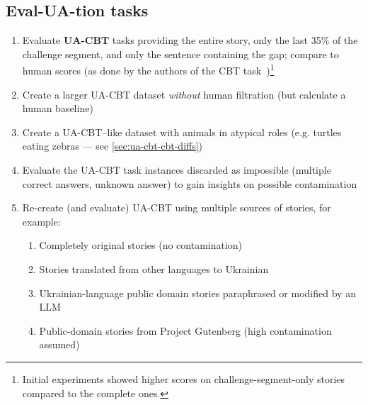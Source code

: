 \subsection{Eval-UA-tion tasks}
\begin{enumerate}
    \tightlist
    \item Evaluate \textbf{UA-CBT} tasks providing the entire story, only the last 35\% of the challenge segment, and only the sentence containing the gap; compare to human scores (as done by the authors of the CBT task~\cite{taskCBT})\footnote{Initial experiments showed higher scores on challenge-segment-only stories compared to the complete ones.}
    \item Create a larger UA-CBT dataset \textit{without} human filtration (but calculate a human baseline)
    \item Create a UA-CBT–like dataset with animals in atypical roles (e.g. turtles eating zebras — see \autoref{sec:ua-cbt-cbt-diffs})

    \item Evaluate the UA-CBT task instances discarded as impossible (multiple correct answers, unknown answer) to gain insights on possible contamination
    \item  Re-create (and evaluate) UA-CBT using multiple sources of stories, for example:
        \begin{enumerate}
            \tightlist
            \item Completely original stories (no contamination)
            \item Stories translated from other languages to Ukrainian
            \item Ukrainian-language public domain stories paraphrased or modified by an LLM
            \item Public-domain stories from Project Gutenberg (high contamination assumed)
        \end{enumerate}
\end{enumerate}
